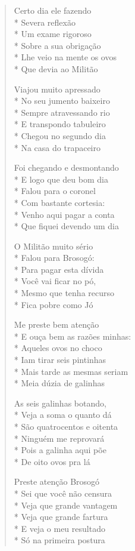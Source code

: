 \begin{verse}
Certo dia ele fazendo\\*
Severa reflexão\\*
Um exame rigoroso\\*
Sobre a sua obrigação\\*
Lhe veio na mente os ovos\\*
Que devia ao Militão

Viajou muito apressado\\*
No seu jumento baixeiro\\*
Sempre atravessando rio\\*
E transpondo tabuleiro\\*
Chegou no segundo dia\\*
Na casa do trapaceiro

Foi chegando e desmontando\\*
E logo que deu bom dia\\*
Falou para o coronel\\*
Com bastante cortesia:\\*
Venho aqui pagar a conta\\*
Que fiquei devendo um dia

O Militão muito sério\\*
Falou para Brosogó:\\*
Para pagar esta dívida\\*
Você vai ficar no pó,\\*
Mesmo que tenha recurso\\*
Fica pobre como Jó

Me preste bem atenção\\*
E ouça bem as razões minhas:\\*
Aqueles ovos no choco\\*
Iam tirar seis pintinhas\\*
Mais tarde as mesmas seriam\\*
Meia dúzia de galinhas

As seis galinhas botando,\\*
Veja a soma o quanto dá\\*
São quatrocentos e oitenta\\*
Ninguém me reprovará\\*
Pois a galinha aqui põe\\*
De oito ovos pra lá

Preste atenção Brosogó\\*
Sei que você não censura\\*
Veja que grande vantagem\\*
Veja que grande fartura\\*
E veja o meu resultado\\*
Só na primeira postura


\end{verse}
